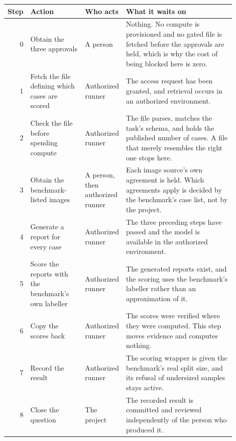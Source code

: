 \begingroup
\setlength{\tabcolsep}{4pt}
\begin{tabular}{@{}r>{\raggedright\arraybackslash}p{0.24\linewidth}>{\raggedright\arraybackslash}p{0.18\linewidth}>{\raggedright\arraybackslash}p{0.48\linewidth}@{}}
\toprule
Step & Action & Who acts & What it waits on \\
\midrule
0 & Obtain the three approvals & A person & Nothing. No compute is provisioned and no gated file is fetched before the approvals are held, which is why the cost of being blocked here is zero. \\
1 & Fetch the file defining which cases are scored & Authorized runner & The access request has been granted, and retrieval occurs in an authorized environment. \\
2 & Check the file before spending compute & Authorized runner & The file parses, matches the task's schema, and holds the published number of cases. A file that merely resembles the right one stops here. \\
3 & Obtain the benchmark-listed images & A person, then authorized runner & Each image source's own agreement is held. Which agreements apply is decided by the benchmark's case list, not by the project. \\
4 & Generate a report for every case & Authorized runner & The three preceding steps have passed and the model is available in the authorized environment. \\
5 & Score the reports with the benchmark's own labeller & Authorized runner & The generated reports exist, and the scoring uses the benchmark's labeller rather than an approximation of it. \\
6 & Copy the scores back & Authorized runner & The scores were verified where they were computed. This step moves evidence and computes nothing. \\
7 & Record the result & Authorized runner & The scoring wrapper is given the benchmark's real split size, and its refusal of undersized samples stays active. \\
8 & Close the question & The project & The recorded result is committed and reviewed independently of the person who produced it. \\
\bottomrule
\end{tabular}
\endgroup
